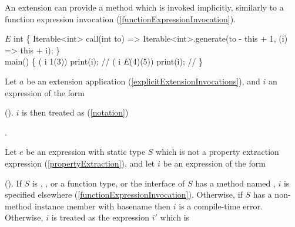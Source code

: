 \documentclass[makeidx]{article}
\begin{document}
\LMHash{}%
An extension can provide a \CALL{} method which is invoked implicitly,
similarly to a function expression invocation
(\ref{functionExpressionInvocation}).


\begin{dartCode}
\EXTENSION{} $E$ \ON{} int \{
  Iterable<int> call(int to) =>
      Iterable<int>.generate(to - this + 1, (i) => this + i);
\}
\\
\VOID{} main() \{
  \FOR{} (\VAR{} i \IN{} 1(3)) print(i); // 
  \FOR{} (\VAR{} i \IN{} $E$(4)(5)) print(i); // 
\}
\end{dartCode}


\LMHash{}%
%
Let $a$ be an extension application
(\ref{explicitExtensionInvocations}),
and $i$ an expression of the form

\noindent
{}

\noindent
().
$i$ is then treated as
(\ref{notation})

\noindent
{}.


\LMHash{}%
%
Let $e$ be an expression with static type $S$
which is not a property extraction expression
(\ref{propertyExtraction}),
and let $i$ be an expression of the form

\noindent
{}

\noindent
().
If $S$ is \DYNAMIC, \FUNCTION, or a function type,
or the interface of $S$ has a method named \CALL,
$i$ is specified elsewhere
(\ref{functionExpressionInvocation}).
Otherwise, if $S$ has a non-method instance member with basename \CALL{}
then $i$ is a compile-time error.
Otherwise, $i$ is treated as the expression $i'$ which is
\end{document}
